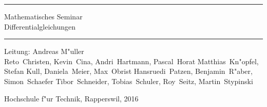 \documentclass{book}
\begin{document}
	\pagestyle{fancy}
	\frontmatter
	\newcommand\HRule{\noindent\rule{\linewidth}{1.5pt}}
	\begin{titlepage}
		\HRule
		\vspace*{5pt}
		\begin{flushright}
			{
				\LARGE
				Mathematisches Seminar\\
				\vspace*{20pt}
				\Huge
				Differentialgleichungen%
			}
			\vspace*{5pt}
		\end{flushright}
		\HRule
		\begin{flushright}
			\vspace{60pt}
			\Large
			Leitung: Andreas M"uller\\
			\vspace{40pt}
			\Large
			Reto~Christen,
			Kevin~Cina,
			Andri~Hartmann,
			Pascal~Horat %
			Matthias~Kn"opfel,
			Stefan Kull,
			Daniela~Meier,
			Max~Obrist %
			Hansruedi~Patzen,
			Benjamin~R"aber,
			Simon~Schaefer %
			Tibor~Schneider,
			Tobias~Schuler,
			Roy~Seitz,
			Martin~Stypinski
		\end{flushright}
		\begin{center}
			Hochschule f"ur Technik, Rapperswil, 2016
		\end{center}
	\end{titlepage}
	\hypersetup{
		linktoc=all,
		linkcolor=blue
	}
	\newenvironment{beispiele}{
		\bgroup\smallskip\parindent0pt\bf Beispiele\egroup
		
		\begin{list}{\arabic{beispiel}.}
			{\usecounter{beispiel}
				\setlength{\labelsep}{5mm}
				\setlength{\rightmargin}{0pt}
			}}{\end{list}}
		\newenvironment{uebungsaufgaben}{
			\begin{list}{\arabic{uebungsaufgabe}.}
				{\usecounter{uebungsaufgabe}
					\setlength{\labelwidth}{2cm}
					\setlength{\leftmargin}{0pt}
					\setlength{\labelsep}{5mm}
					\setlength{\rightmargin}{0pt}
					\setlength{\itemindent}{0pt}
				}}{\end{list}\vfill\pagebreak}
			\newenvironment{teilaufgaben}{
				\begin{enumerate}
					\renewcommand{\labelenumi}{\alph{enumi})}
				}{\end{enumerate}}
\end{document}
